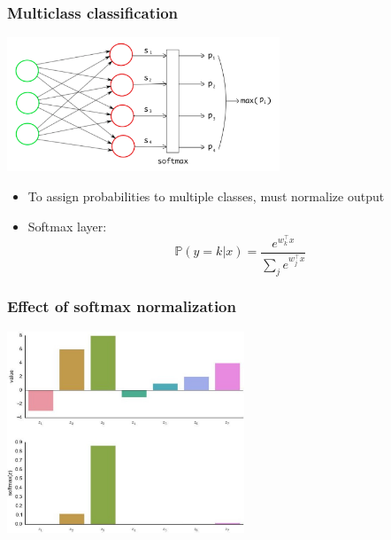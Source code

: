 \documentclass[10pt]{beamer}
\begin{document}

\begin{frame}
  \frametitle{Multiclass classification}
  \begin{center}
  \includegraphics[height=4cm]{images/softmax.png}
  \end{center}
  \begin{itemize}
	\item To assign probabilities to multiple classes, must {\color{red} normalize} output
	\item {\color{blue} Softmax layer}: 
	\[\mathbb{P}(y=k|x) = \frac {e^{w_k^\top x}} {\sum_j e^{w_j^\top x}}\]
  \end{itemize}
\end{frame}

\begin{frame}
  \frametitle{Effect of softmax normalization}
  \begin{center}
  \includegraphics[height=6cm]{images/norm.png}
  \end{center}
\end{frame}
\end{document}
